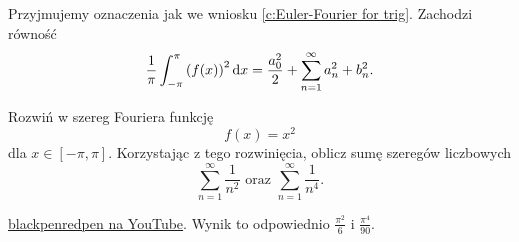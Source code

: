 \begin{corollary}
    Przyjmujemy oznaczenia jak we wniosku \ref{c:Euler-Fourier for trig}. Zachodzi równość
    \[ \frac{1}{\pi}\int_{-\pi}^\pi \left(f(x)\right)^2 \operatorname{d}\!{x} = \frac{a_0^2}{2} + \sum_{n=1}^\infty a_n^2 + b_n^2. \]
\end{corollary}

\begin{example}
    Rozwiń w szereg Fouriera funkcję
    \[ f(x) = x^2 \]
    dla $x \in [-\pi, \pi]$. Korzystając z tego rozwinięcia, oblicz sumę szeregów liczbowych
    \[ \sum_{n=1}^\infty \frac{1}{n^2} \text{ oraz } \sum_{n=1}^\infty \frac{1}{n^4}. \]
\end{example}
\begin{solution}
    \href{https://www.youtube.com/watch?v=2VYBGF_MPIU}{blackpenredpen na YouTube}. Wynik to odpowiednio $\frac{\pi^2}{6}$ i $\frac{\pi^4}{90}$.
\end{solution}
